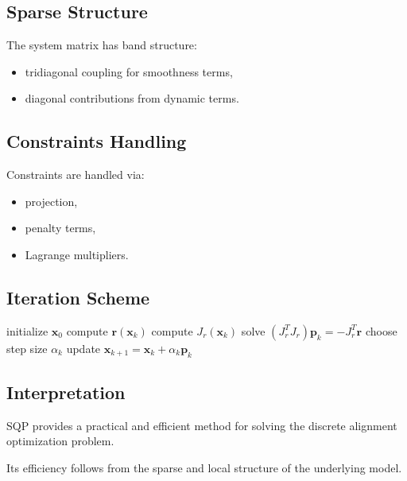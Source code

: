 \subsection{Sparse Structure}

The system matrix has band structure:
\begin{itemize}
\item tridiagonal coupling for smoothness terms,
\item diagonal contributions from dynamic terms.
\end{itemize}

\subsection{Constraints Handling}

Constraints are handled via:
\begin{itemize}
\item projection,
\item penalty terms,
\item Lagrange multipliers.
\end{itemize}

\subsection{Iteration Scheme}

\begin{algorithm}
\caption{SQP iteration}
\begin{algorithmic}
\State initialize $\mathbf{x}_0$
  \State compute $\mathbf{r}(\mathbf{x}_k)$
  \State compute $J_r(\mathbf{x}_k)$
  \State solve $(J_r^T J_r)\mathbf{p}_k = -J_r^T \mathbf{r}$
  \State choose step size $\alpha_k$
  \State update $\mathbf{x}_{k+1} = \mathbf{x}_k + \alpha_k \mathbf{p}_k$
\EndFor
\end{algorithmic}
\end{algorithm}

\subsection{Interpretation}

\begin{summary}
SQP provides a practical and efficient method for solving the discrete
alignment optimization problem.

Its efficiency follows from the sparse and local structure of the
underlying model.
\end{summary}
